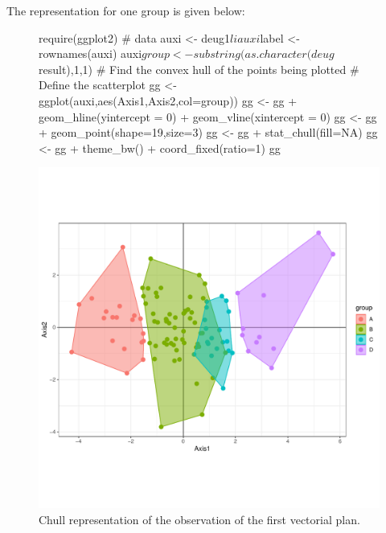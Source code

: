 \documentclass[a4paper,10pt]{article}
\begin{document}
The representation for one group is given below:

\begin{figure}[H]
\begin{center}
\begin{Schunk}
\begin{Sinput}
  require(ggplot2)
  # data 
  auxi <- deug1$li
  auxi$label <- rownames(auxi)
  auxi$group <- substring(as.character(deug$result),1,1)
  # Find the convex hull of the points being plotted
  # Define the scatterplot
  gg <- ggplot(auxi,aes(Axis1,Axis2,col=group))
  gg <- gg + geom_hline(yintercept = 0) + geom_vline(xintercept = 0)
  gg <- gg + geom_point(shape=19,size=3)
  gg <- gg + stat_chull(fill=NA)
  gg <-  gg + theme_bw() + coord_fixed(ratio=1)
  gg
\end{Sinput}
\end{Schunk}
\includegraphics{figs/sweave-lichull1}
\caption{Chull representation of the observation of the first vectorial plan.}
\label{fig:lichull1}
\end{center}
\end{figure}
\end{document}
